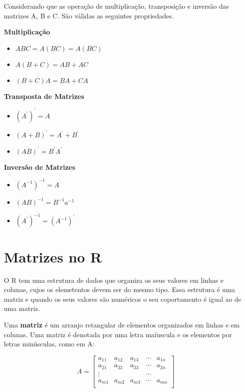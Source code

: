 \documentclass[
]{book}
\providecommand{\tightlist}{%
  \setlength{\itemsep}{0pt}\setlength{\parskip}{0pt}}
\begin{document}
Considerando que as operação de multiplicação, transposição e inversão das matrizes A, B e C. São válidas as seguintes propriedades.

\textbf{Multiplicação}

\begin{itemize}
\tightlist
\item
  \(ABC=A(BC)=A(BC)\)
\item
  \(A(B+C) = AB + AC\)
\item
  \((B+C)A = BA + CA\)
\end{itemize}

\textbf{Transposta de Matrizes}

\begin{itemize}
\tightlist
\item
  \(\left(A^\prime\right)^\prime = A\)
\item
  \(\left(A+B\right)^\prime= A^\prime + B^\prime\)
\item
  \(\left(AB\right)^\prime = B^\prime A^\prime\)
\end{itemize}

\textbf{Inversão de Matrizes}

\begin{itemize}
\tightlist
\item
  \(\left(A^{-1}\right)^{-1} = A\)
\item
  \(\left(AB\right)^{-1}= B^{-1}a^{-1}\)
\item
  \(\left(A^\prime\right)^{-1} = \left(A^{-1}\right)^\prime\)
\end{itemize}

\hypertarget{cap3}{%
\chapter{Matrizes no R}\label{cap3}}

O R tem uma estrutura de dados que organiza os seus valores em linhas e colunas, cujos os elemetentos devem ser do mesmo tipo. Essa estrutura é uma matriz e quando os seus valores são numéricos o seu coportamento é igual ao de uma matriz.

Uma \textbf{matriz} é um arranjo retangular de elementos organizados em linhas e em colunas. Uma matriz é denotada por uma letra maíuscula e os elementos por letras minúsculas, como em A:

\begin{equation*}
A = 
\begin{bmatrix}
a_{11} & a_{12} & a_{13} & \cdots & a_{1n} \\
a_{21} & a_{22} & a_{23} & \cdots & a_{2n} \\
\vdots &        &        & \cdots &        \\
a_{m1} & a_{m2} & a_{m3} & \cdots & a_{mn} \\
\end{bmatrix}
\end{equation*}
\end{document}
